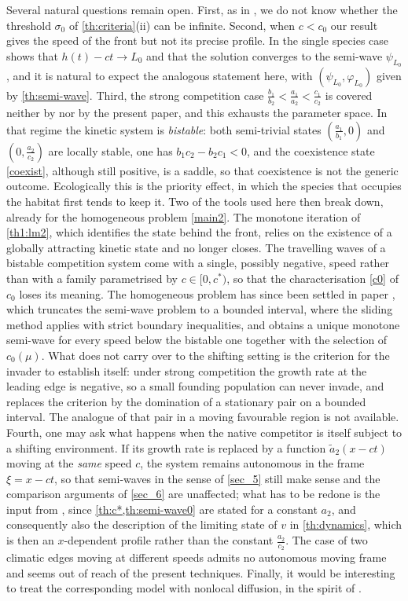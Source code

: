 \documentclass[reqno]{amsart}
\theoremstyle{plain}
\theoremstyle{definition}
\theoremstyle{remark}
\begin{document}
Several natural questions remain open. First, as in \cite{HU20205931}, we do not
know whether the threshold $\sigma_0$ of \cref{th:criteria}(ii) can be infinite.
Second, when $c<c_0$ our result gives the speed of the front but not its precise
profile. In the single species case \cite[Theorem 1.2]{HU20205931} shows that
$h(t)-ct\to L_0$ and that the solution converges to the semi-wave
$\psi_{L_0}$, and it is natural to expect the analogous statement here, with
$(\psi_{L_0},\varphi_{L_0})$ given by \cref{th:semi-wave}. Third, the strong
competition case $\frac{b_1}{b_2}<\frac{a_1}{a_2}<\frac{c_1}{c_2}$ is covered
neither by \cite{DLN2026a} nor by the present paper, and this exhausts the
parameter space. In that regime the kinetic system is \emph{bistable}: both
semi-trivial states $(\frac{a_1}{b_1},0)$ and $(0,\frac{a_2}{c_2})$ are locally
stable, one has $b_1c_2-b_2c_1<0$, and the coexistence state \eqref{coexist},
although still positive, is a saddle, so that coexistence is not the generic
outcome. Ecologically this is the priority effect, in which the species that
occupies the habitat first tends to keep it. Two of the tools used here then break down, already for the
homogeneous problem \eqref{main2}. The monotone iteration of \cref{th1:lm2},
which identifies the state behind the front, relies on the existence of a
globally attracting kinetic state and no longer closes. The travelling waves of
a bistable competition system come with a single, possibly negative, speed
rather than with a family parametrised by $c\in[0,c^*)$, so that the
characterisation \eqref{c0} of $c_0$ loses its meaning. The homogeneous problem
has since been settled in paper \cite{DL2026c}, which truncates
the semi-wave problem to a bounded interval, where the sliding method applies
with strict boundary inequalities, and obtains a unique monotone semi-wave for
every speed below the bistable one together with the selection of $c_0(\mu)$.
What does not carry over to the shifting setting is the criterion for the
invader to establish itself: under strong competition the growth rate at the
leading edge is negative, so a small founding population can never invade, and
\cite{DL2026c} replaces the criterion by the domination of a stationary pair on
a bounded interval. The analogue of that pair in a moving favourable region is
not available. Fourth, one may ask what happens when the native
competitor is itself subject to a shifting environment. If its growth rate is
replaced by a function $\tilde a_2(x-ct)$ moving at the \emph{same} speed $c$,
the system remains autonomous in the frame $\xi=x-ct$, so that semi-waves in the
sense of \cref{sec_5} still make sense and the comparison arguments of
\cref{sec_6} are unaffected; what has to be redone is the input from
\cite{MR3986328}, since \cref{th:c*,th:semi-wave0} are stated for a constant
$a_2$, and consequently also the description of the limiting state of $v$ in
\cref{th:dynamics}, which is then an $x$-dependent profile rather than the
constant $\frac{a_2}{c_2}$. The case of two climatic edges moving at different
speeds admits no autonomous moving frame and seems out of reach of the present
techniques. Finally, it
would be interesting to treat the corresponding model with nonlocal diffusion, in
the spirit of \cite{MR4873231}.
\end{document}
